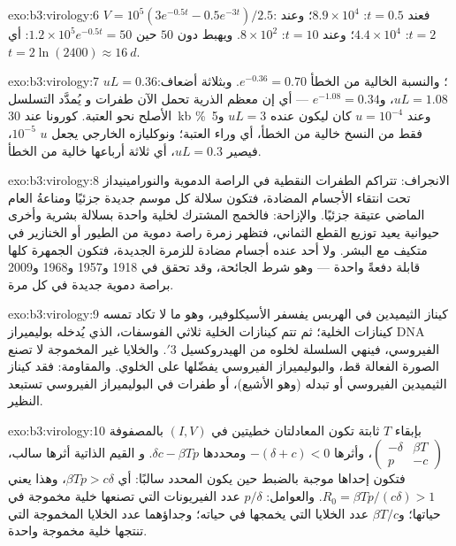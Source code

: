 \begin{solution}{exo:b3:virology:6}
$V = 10^{5}(3e^{-0.5t} - 0.5e^{-3t})/2.5$: فعند $t = 0.5$: $8.9\times
10^{4}$؛ وعند $t = 2$: $4.4\times 10^{4}$؛ وعند $t = 10$: $8\times 10^{2}$. ويهبط دون
$50$ حين $1.2\times 10^{5}e^{-0.5t} = 50$: أي $t = 2\ln(2400) \approx
\qty{16}{d}$.
\end{solution}

\begin{solution}{exo:b3:virology:7}
$uL = 0.36$؛ والنسبة الخالية من الخطأ $e^{-0.36} = 0.70$. وبثلاثة أضعاف: $uL =
1.08$، و$e^{-1.08} = 0.34$ --- أي إن معظم الذرية تحمل الآن طفرات و
يُمدَّد التسلسل الأصلح نحو العتبة.  كورونا عند
\qty{30}{kb} وعند $u = 10^{-4}$ كان ليكون عنده $uL = 3$ و\qty{5}{\%} فقط
من النسخ خالية من الخطأ، أي وراء العتبة؛ ونوكليازه الخارجي يجعل $u$
$10^{-5}$، فيصير $uL = 0.3$، أي ثلاثة أرباعها خالية من الخطأ.
\end{solution}

\begin{solution}{exo:b3:virology:8}
الانجراف: تتراكم الطفرات النقطية في الراصة الدموية والنورامينيداز
تحت انتقاء الأجسام المضادة، فتكون سلالة كل موسم
جديدة جزئيًا ومناعةُ العام الماضي عتيقة جزئيًا. والإزاحة: فالخمج المشترك
لخلية واحدة بسلالة بشرية وأخرى حيوانية يعيد توزيع القطع
الثماني، فتظهر زمرة راصة دموية من الطيور أو الخنازير في
 متكيف مع البشر. ولا أحد عنده أجسام مضادة للزمرة الجديدة، فتكون
الجمهرة كلها قابلة دفعةً واحدة --- وهو شرط
الجائحة، وقد تحقق في 1918 و1957 و1968 و2009 براصة دموية جديدة في كل
مرة.
\end{solution}

\begin{solution}{exo:b3:virology:9}
كيناز الثيميدين في  الهربس يفسفر الأسيكلوفير، وهو ما
لا تكاد تمسه كينازات الخلية؛ ثم تتم كينازات الخلية
ثلاثي الفوسفات، الذي يُدخله بوليميراز DNA الفيروسي، فينهي
السلسلة لخلوه من الهيدروكسيل 3$'$. والخلايا غير المخموجة لا تصنع الصورة
الفعالة قط، والبوليميراز الفيروسي يفضّلها على الخلوي.
والمقاومة: فقد كيناز الثيميدين الفيروسي أو تبدله (وهو
الأشيع)، أو طفرات في البوليميراز الفيروسي تستبعد
النظير.
\end{solution}

\begin{solution}{exo:b3:virology:10}
بإبقاء $T$ ثابتة تكون المعادلتان خطيتين في $(I, V)$ بالمصفوفة
$\begin{pmatrix} -\delta & \beta T \\ p & -c \end{pmatrix}$، وأثرها
$-(\delta + c) < 0$ ومحددها $\delta c - \beta Tp$. و
القيم الذاتية أثرها سالب، فتكون إحداها موجبة بالضبط حين يكون
المحدد سالبًا: أي $\beta Tp > c\delta$، وهذا يعني $R_{0} = \beta
Tp/(c\delta) > 1$. والعوامل: $p/\delta$ عدد الفيريونات التي تصنعها
خلية مخموجة في حياتها؛ و$\beta T/c$ عدد الخلايا التي يخمجها
 في حياته؛ وجداؤهما عدد الخلايا المخموجة
التي تنتجها خلية مخموجة واحدة.
\end{solution}

